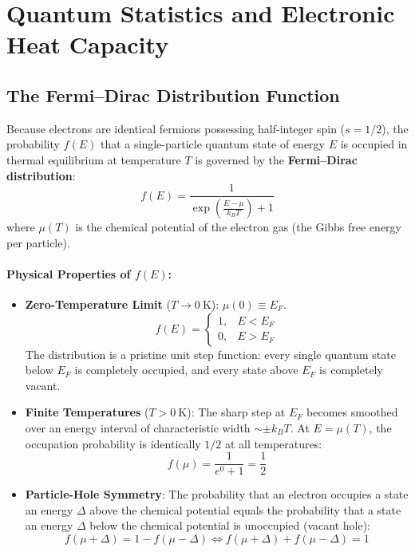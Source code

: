 \documentclass[11pt,a4paper]{article}
\begin{document}
\clearpage


\section{Quantum Statistics and Electronic Heat Capacity}
\label{sec:heat_capacity}

\subsection{The Fermi--Dirac Distribution Function}
Because electrons are identical fermions possessing half-integer spin ($s=1/2$), the probability $f(E)$ that a single-particle quantum state of energy $E$ is occupied in thermal equilibrium at temperature $T$ is governed by the \textbf{Fermi--Dirac distribution}:
\begin{equation}
\boxed{f(E) = \frac{1}{\exp\left(\frac{E-\mu}{k_B T}\right) + 1}}
\label{eq:fd_distribution}
\end{equation}
where $\mu(T)$ is the chemical potential of the electron gas (the Gibbs free energy per particle).

\paragraph{Physical Properties of $f(E)$:}
\begin{itemize}[leftmargin=*]
    \item \textbf{Zero-Temperature Limit} ($T \to 0\ \mathrm{K}$): $\mu(0) \equiv E_F$.
    \begin{equation}
    f(E) = \begin{cases} 1, & E < E_F \\ 0, & E > E_F \end{cases}
    \end{equation}
    The distribution is a pristine unit step function: every single quantum state below $E_F$ is completely occupied, and every state above $E_F$ is completely vacant.
    \item \textbf{Finite Temperatures} ($T > 0\ \mathrm{K}$): The sharp step at $E_F$ becomes smoothed over an energy interval of characteristic width $\sim \pm k_B T$. At $E = \mu(T)$, the occupation probability is identically $1/2$ at all temperatures:
    \begin{equation}
    f(\mu) = \frac{1}{e^0 + 1} = \frac{1}{2}
    \end{equation}
    \item \textbf{Particle-Hole Symmetry}: The probability that an electron occupies a state an energy $\Delta$ above the chemical potential equals the probability that a state an energy $\Delta$ below the chemical potential is unoccupied (vacant hole):
    \begin{equation}
    f(\mu + \Delta) = 1 - f(\mu - \Delta) \iff f(\mu + \Delta) + f(\mu - \Delta) = 1
    \label{eq:particle_hole_sym}
    \end{equation}
\end{itemize}
\end{document}
